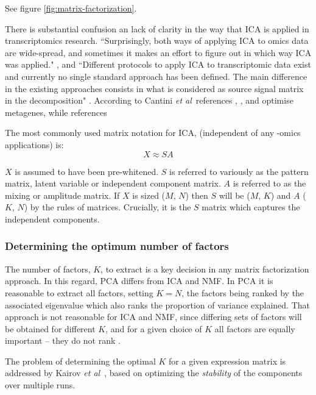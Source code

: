\documentclass[draft, tikz, 12pt,a4paper,oneside,fleqn]{article}
\newcommand{\etal}{{\em et al\/}}
\begin{document}
See figure \ref{fig:matrix-factorization}.

There is substantial confusion an lack of clarity in the way that ICA is applied in transcriptomics research.  ``Surprisingly, both ways of applying ICA to omics data are wide-spread, and sometimes it makes an effort to figure out in which way ICA was applied." \cite{Sompairac2019a}, and ``Different protocols to apply ICA to transcriptomic data exist and currently no single standard approach has been defined. The main difference in the existing approaches consists in what is considered as source signal matrix in the decomposition" \cite{Cantini}.   According to Cantini \etal\, references \cite{Au-Yeung2014}, \cite{Kairov2017}, \cite{Kong2008} and \cite{Lee2003} optimise metagenes, while references \cite{Meng2016} 

The most commonly used matrix notation for ICA, (independent of any -omics applications) is:
\begin{equation}
X \approx S A
\end{equation}

$X$ is assumed to have been pre-whitened.  $S$ is referred to variously as the pattern matrix, latent variable or independent component matrix.  $A$ is referred to as the mixing or amplitude matrix.   If $X$ is sized ($M$, $N$) then $S$ will be ($M$, $K$) and $A$ ($K$, $N$) by the rules of matrices.  Crucially, it is the $S$ matrix which captures the independent components.


\subsubsection{Determining the optimum number of factors}

The number of factors, $K$, to extract is a key decision in any matrix factorization approach.  In this regard, PCA differs from ICA and NMF.  In PCA it is reasonable to extract all factors, setting $K=N$, the factors being ranked by the associated eigenvalue which also ranks the proportion of variance explained.   That approach is not reasonable for ICA and NMF, since differing sets of factors will be obtained for different $K$, and for a given choice of $K$ all factors are equally important -- they do not rank \cite{Stein-OBrien2018}.

The problem of determining the optimal $K$ for a given expression matrix is addressed  by Kairov \etal\ \cite{Kairov2017}, based on optimizing the \emph{stability} of the components over multiple runs.
\end{document}

